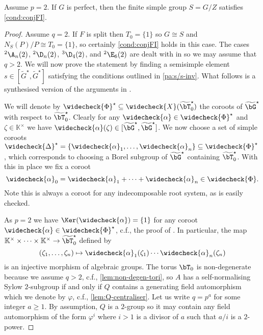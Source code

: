 \documentclass[eqthmnum, nocolour]{jt-calcs}
\begin{document}
\begin{prop}\label{prop:p-2-conjFI}
Assume $p=2$. If $G$ is perfect, then the finite simple group $S = G/Z$ satisfies \cref{cond:conjFI}.
\end{prop}

\begin{proof}
Assume $q = 2$. If $F$ is split then $T_0 = \{1\}$ so $G \cong S$ and $N_S(P)/P \cong T_0 = \{1\}$, so certainly \cref{cond:conjFI} holds in this case. The cases ${}^2\A_n(2)$, ${}^2\D_n(2)$, ${}^3\D_4(2)$, and ${}^2\E_6(2)$ are dealt with in \cite{schaeffer-fry:2015:odd-degree-characters} so we may assume that $q > 2$. We will now prove the statement by finding a semisimple element $s \in [\widetilde{G}^{\star},\widetilde{G}^{\star}]$ satisfying the conditions outlined in \cref{pa:s/s-inv}. What follows is a synthesised version of the arguments in \cite{schaeffer-fry:2015:odd-degree-characters}.

We will denote by $\widecheck{\Phi}^{\star} \subseteq \widecheck{X}(\widetilde{\bT}_0^{\star})$ the coroots of $\widetilde{\bG}^{\star}$ with respect to $\widetilde{\bT}_0^{\star}$. Clearly for any $\widecheck{\alpha} \in \widecheck{\Phi}^{\star}$ and $\zeta \in \mathbb{K}^{\times}$ we have $\widecheck{\alpha}(\zeta) \in [\widetilde{\bG}^\star, \widetilde{\bG}^\star]$. We now choose a set of simple coroots $\widecheck{\Delta}^{\star} = \{\widecheck{\alpha}_1,\dots,\widecheck{\alpha}_n\} \subseteq \widecheck{\Phi}^{\star}$, which corresponds to choosing a Borel subgroup of $\widetilde{\bG}^{\star}$ containing $\widetilde{\bT}_0^{\star}$. With this in place we fix a coroot
\begin{equation*}
\widecheck{\alpha}_0 = \widecheck{\alpha}_1+\cdots+\widecheck{\alpha}_n \in \widecheck{\Phi}.
\end{equation*}
Note this is always a coroot for any indecomposable root system, as is easily checked.

As $p=2$ we have $\Ker(\widecheck{\alpha}) = \{1\}$ for any coroot $\widecheck{\alpha} \in \widecheck{\Phi}^{\star}$, c.f., the proof of \cite[7.3.5]{springer:2009:linear-algebraic-groups}. In particular, the map $\mathbb{K}^{\times} \times \cdots \times \mathbb{K}^{\times} \to \widetilde{\bT}_0^{\star}$ defined by
\begin{equation}\label{eq:torus-embed}
(\zeta_1,\dots,\zeta_n) \mapsto \widecheck{\alpha}_1(\zeta_1)\cdots \widecheck{\alpha}_n(\zeta_n)
\end{equation}
is an injective morphism of algebraic groups. The torus $\bT_0$ is non-degenerate because we assume $q > 2$, c.f., \cref{lem:non-degen-tori}, so $A$ has a self-normalising Sylow $2$-subgroup if and only if $Q$ contains a generating field automorphism which we denote by $\varphi$, c.f., \cref{lem:Q-centraliser}. Let us write $q = p^a$ for some integer $a \geqslant 1$. By assumption, $Q$ is a $2$-group so it may contain any field automorphism of the form $\varphi^i$ where $i>1$ is a divisor of $a$ such that $a/i$ is a $2$-power.


\end{proof}
\end{document}
